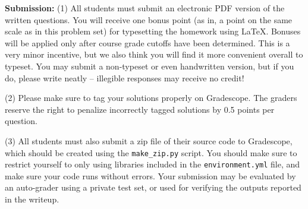 {\bf Submission:} 
(1) All students must submit an electronic PDF version of the written questions. You will receive one bonus point (as in, a point on the same scale as in this problem set) for typesetting the homework using \LaTeX. Bonuses will be applied only after course grade cutoffs have been determined.
This is a very minor incentive, but we also think you will find it more convenient overall to typeset. You may submit a non-typeset or even handwritten version, but if you do, please write neatly -- illegible responses may receive no credit!

(2) Please make sure to tag your solutions properly on Gradescope.
The graders reserve the right to penalize incorrectly tagged solutions by 0.5 points per question.

(3) All students must also submit a zip file of their source code to Gradescope, which should be created using the
\texttt{make\_zip.py} script. You
should make sure to restrict yourself to only using libraries included in
the \texttt{environment.yml} file, and make sure your code runs without errors.
Your submission may be evaluated by an auto-grader using a private test set, or used for verifying the outputs reported in the writeup. 


